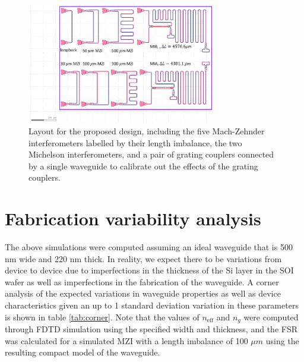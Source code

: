 \documentclass[journal]{IEEEtran}
\begin{document}
\begin{figure}[t!]
  \centering
  \includegraphics[width = 3.25in]{fig/layout_v2.png}
  \caption{Layout for the proposed design, including the five Mach-Zehnder interferometers labelled by their length imbalance, the two Michelson interferometers, and a pair of grating couplers connected by a single waveguide to calibrate out the effects of the grating couplers.}
  \label{fig:layout}
\end{figure}

\section{Fabrication variability analysis}

The above simulations were computed assuming an ideal waveguide that is 500 nm wide and 220 nm thick. In reality, we expect there to be variations from device to device due to imperfections in the thickness of the Si layer in the SOI wafer as well as imperfections in the fabrication of the waveguide. A corner analysis of the expected variations in waveguide properties as well as device characteristics given an up to 1 standard deviation variation in these parameters is shown in table \ref{tab:corner}. Note that the values of $n_{\text{eff}}$ and $n_g$ were computed through FDTD simulation using the specified width and  thickness, and the FSR was calculated for a simulated MZI with a length imbalance of 100 $\mu m$ using the resulting compact model of the waveguide.
\end{document}
